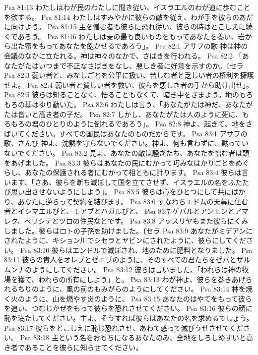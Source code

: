 Psa 81:13  わたしはわが民のわたしに聞き従い、イスラエルのわが道に歩むことを欲する。
Psa 81:14  わたしはすみやかに彼らの敵を従え、わが手を彼らのあだに向けよう。
Psa 81:15  主を憎む者も彼らに恐れ従い、彼らの時はとこしえに続くであろう。
Psa 81:16  わたしは麦の最も良いものをもってあなたを養い、岩から出た蜜をもってあなたを飽かせるであろう」。
Psa 82:1  アサフの歌 神は神の会議のなかに立たれる。神は神々のなかで、さばきを行われる。
Psa 82:2  「あなたがたはいつまで不正なさばきをなし、悪しき者に好意を示すのか。〔セラ
Psa 82:3  弱い者と、みなしごとを公平に扱い、苦しむ者と乏しい者の権利を擁護せよ。
Psa 82:4  弱い者と貧しい者を救い、彼らを悪しき者の手から助け出せ」。
Psa 82:5  彼らは知ることなく、悟ることもなくて、暗き中をさまよう。地のもろもろの基はゆり動いた。
Psa 82:6  わたしは言う、「あなたがたは神だ、あなたがたは皆いと高き者の子だ。
Psa 82:7  しかし、あなたがたは人のように死に、もろもろの君のひとりのように倒れるであろう」。
Psa 82:8  神よ、起きて、地をさばいてください。すべての国民はあなたのものだからです。
Psa 83:1  アサフの歌、さんび 神よ、沈黙を守らないでください。神よ、何も言わずに、黙っていないでください。
Psa 83:2  見よ、あなたの敵は騒ぎたち、あなたを憎む者は頭をあげました。
Psa 83:3  彼らはあなたの民にむかって巧みなはかりごとをめぐらし、あなたの保護される者にむかって相ともに計ります。
Psa 83:4  彼らは言います、「さあ、彼らを断ち滅ぼして国を立てさせず、イスラエルの名をふたたび思い出させないようにしよう」。
Psa 83:5  彼らは心をひとつにして共にはかり、あなたに逆らって契約を結びます。
Psa 83:6  すなわちエドムの天幕に住む者とイシマエルびと、モアブとハガルびと、
Psa 83:7  ゲバルとアンモンとアマレク、ペリシテとツロの住民などです。
Psa 83:8  アッスリヤもまた彼らにくみしました。彼らはロトの子孫を助けました。〔セラ
Psa 83:9  あなたがミデアンにされたように、キション川でシセラとヤビンにされたように、彼らにしてください。
Psa 83:10  彼らはエンドルで滅ぼされ、地のために肥料となりました。
Psa 83:11  彼らの貴人をオレブとゼエブのように、そのすべての君たちをゼバとザルムンナのようにしてください。
Psa 83:12  彼らは言いました、「われらは神の牧場を獲て、われらの所有にしよう」と。
Psa 83:13  わが神よ、彼らを巻きあげられるちりのように、風の前のもみがらのようにしてください。
Psa 83:14  林を焼く火のように、山を燃やす炎のように、
Psa 83:15  あなたのはやてをもって彼らを追い、つむじかぜをもって彼らを恐れさせてください。
Psa 83:16  彼らの顔に恥を満たしてください。主よ、そうすれば彼らはあなたの名を求めるでしょう。
Psa 83:17  彼らをとこしえに恥じ恐れさせ、あわて惑って滅びうせさせてください。
Psa 83:18  主という名をおもちになるあなたのみ、全地をしろしめすいと高き者であることを彼らに知らせてください。
